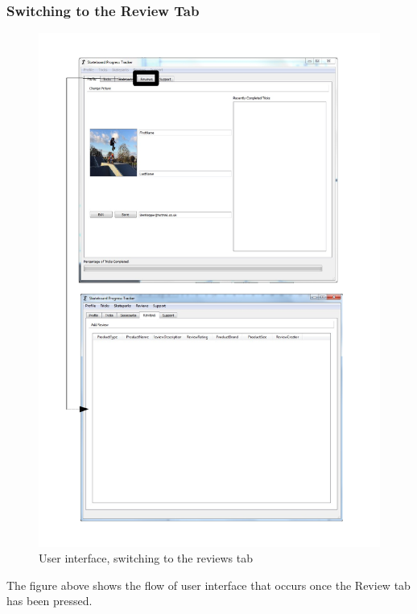 \subsubsection{Switching to the Review Tab}
\begin{figure}[H]
    \includegraphics[width=\textwidth]{./Maintenance/Figures/ReviewTab.pdf}
    \caption{User interface, switching to the reviews tab} \label{fig:Review Tab UI}
\end{figure}

The figure above shows the flow of user interface that occurs once the Review tab has been pressed.


